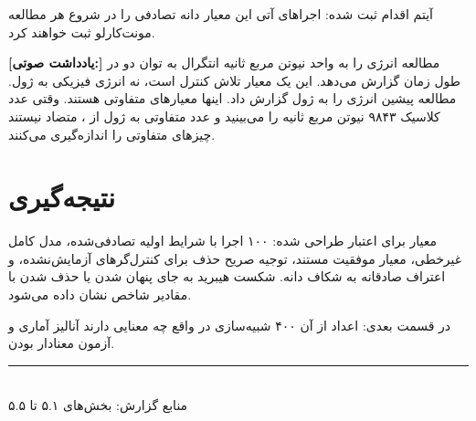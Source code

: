 \documentclass[12pt, a4paper]{article}
\newcommand{\dash}{\lr{---}}
\begin{document}
آيتم اقدام ثبت شده: اجراهای آتی اين معيار دانه تصادفی  را در شروع هر مطالعه مونت‌کارلو ثبت خواهند کرد.


\begin{mdframed}[
  backgroundcolor=audiotan,
  linecolor=audionote!70,
  linewidth=1pt,
  innerleftmargin=12pt,
  innerrightmargin=12pt,
  innertopmargin=8pt,
  innerbottommargin=8pt
]
\textbf{\color{audionote}[يادداشت صوتی:]}
مطالعه  انرژی را به واحد نيوتن مربع ثانيه \dash{} انتگرال  به توان دو در طول زمان \dash{} گزارش می‌دهد. اين يک معيار تلاش کنترل است، نه انرژی فيزيکی به ژول. مطالعه پيشين  انرژی را به ژول گزارش داد. اينها معيارهای متفاوتی هستند. وقتی عدد  کلاسيک ۹۸۴۳ نيوتن مربع ثانيه را می‌بينيد و عدد متفاوتی به ژول از ، متضاد نيستند \dash{} چيزهای متفاوتی را اندازه‌گيری می‌کنند.
\end{mdframed}

\vspace{0.6cm}

\section{نتيجه‌گيری}

معيار  برای اعتبار طراحی شده: ۱۰۰ اجرا با شرايط اوليه تصادفی‌شده، مدل کامل غيرخطی، معيار موفقيت مستند، توجيه صريح حذف برای کنترل‌گرهای آزمايش‌نشده، و اعتراف صادقانه به شکاف دانه. شکست هيبريد به جای پنهان شدن يا حذف شدن با مقادير شاخص نشان داده می‌شود.

در قسمت بعدی: اعداد از آن ۴۰۰ شبيه‌سازی در واقع چه معنايی دارند \dash{} آناليز آماری و آزمون معنادار بودن.

\vspace{1.5cm}
\begin{center}
{\color{seriesblue}\rule{0.45\linewidth}{0.4pt}}\\[8pt]
{\small\color{sectiongray}
منابع گزارش: بخش‌های ۵.۱ تا ۵.۵
}
\end{center}
\end{document}
